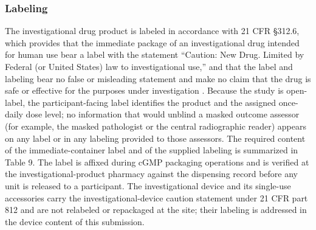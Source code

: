 \subsubsection{Labeling}

The investigational drug product is labeled in accordance with 21 CFR \S 312.6,
which provides that the immediate package of an investigational drug intended for
human use bear a label with the statement ``Caution: New Drug. Limited by Federal
(or United States) law to investigational use,'' and that the label and labeling
bear no false or misleading statement and make no claim that the drug is safe or
effective for the purposes under investigation \cite{phase1guidance}. Because the
study is open-label, the participant-facing label identifies the product and the
assigned once-daily dose level; no information that would unblind a masked outcome
assessor (for example, the masked pathologist or the central radiographic reader)
appears on any label or in any labeling provided to those assessors. The required
content of the immediate-container label and of the supplied labeling is
summarized in Table 9. The label is affixed during cGMP packaging operations and
is verified at the investigational-product pharmacy against the dispensing record
before any unit is released to a participant. The investigational device and its
single-use accessories carry the investigational-device caution statement under
21 CFR part 812 and are not relabeled or repackaged at the site; their labeling is
addressed in the device content of this submission.

